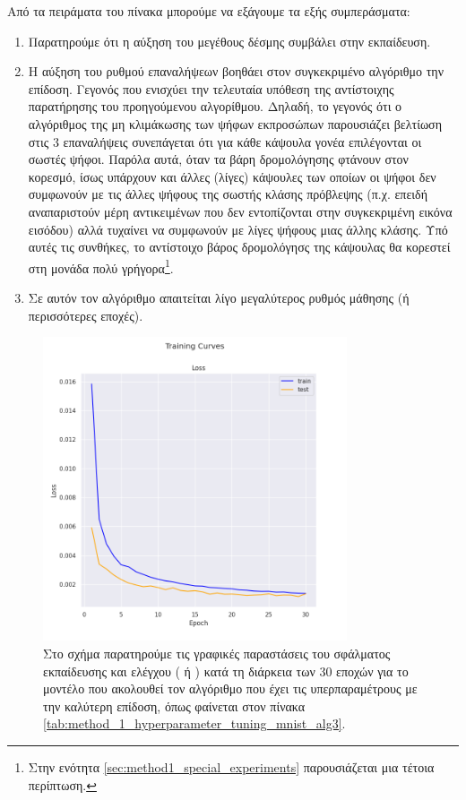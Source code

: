 Από τα πειράματα του πίνακα μπορούμε να εξάγουμε τα εξής συμπεράσματα:
\begin{enumerate}
    \item Παρατηρούμε ότι η αύξηση του μεγέθους δέσμης συμβάλει στην εκπαίδευση.
    \item Η αύξηση του ρυθμού επαναλήψεων βοηθάει στον συγκεκριμένο αλγόριθμο την επίδοση. Γεγονός που ενισχύει την τελευταία υπόθεση της αντίστοιχης παρατήρησης του προηγούμενου αλγορίθμου. Δηλαδή, το γεγονός ότι ο αλγόριθμος της μη κλιμάκωσης των ψήφων εκπροσώπων παρουσιάζει βελτίωση στις 3 επαναλήψεις συνεπάγεται ότι για κάθε κάψουλα γονέα επιλέγονται οι σωστές ψήφοι. Παρόλα αυτά, όταν τα βάρη δρομολόγησης φτάνουν στον κορεσμό, ίσως υπάρχουν και άλλες (λίγες) κάψουλες των οποίων οι ψήφοι δεν συμφωνούν με τις άλλες ψήφους της σωστής κλάσης πρόβλεψης (π.χ. επειδή αναπαριστούν μέρη αντικειμένων που δεν εντοπίζονται στην συγκεκριμένη εικόνα εισόδου) αλλά τυχαίνει να συμφωνούν με λίγες ψήφους μιας άλλης κλάσης. Υπό αυτές τις συνθήκες, το αντίστοιχο βάρος δρομολόγησς της κάψουλας θα κορεστεί στη μονάδα πολύ γρήγορα\footnote{Στην ενότητα \ref{sec:method1_special_experiments} παρουσιάζεται μια τέτοια περίπτωση.}. 
    \item Σε αυτόν τον αλγόριθμο απαιτείται λίγο μεγαλύτερος ρυθμός μάθησης (ή περισσότερες εποχές).
\end{enumerate}
\begin{figure}[h]
    \centering
    \includegraphics[width=0.8\textwidth]{images/chapter experiments/method 1/image 3/train_curve.png}
    \caption{Στο σχήμα παρατηρούμε τις γραφικές παραστάσεις του σφάλματος εκπαίδευσης και ελέγχου ( ή ) κατά τη διάρκεια των 30 εποχών για το μοντέλο που ακολουθεί τον αλγόριθμο  που έχει τις υπερπαραμέτρους με την καλύτερη επίδοση, όπως φαίνεται στον πίνακα \ref{tab:method_1_hyperparameter_tuning_mnist_alg3}.}
    \label{fig:exp_method_1_mnist_alg3}
  \end{figure}
